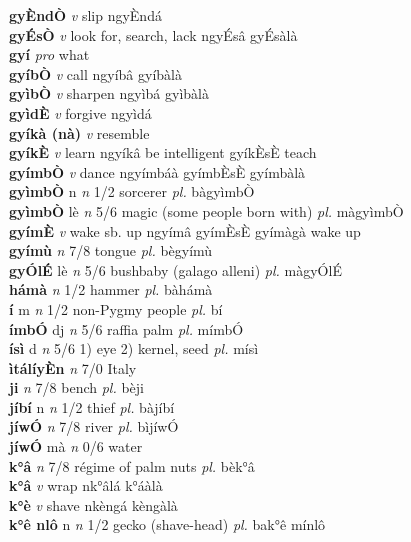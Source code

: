 \documentclass{article}
\begin{document}
{\bf gyÈndÒ}  {\it v} slip   ngyÈndá      \\ 
{\bf gyÉsÒ}  {\it v} look for, search, lack   ngyÉsâ   gyÉsàlà   \\ 
{\bf gyí}  {\it pro} what         \\ 
{\bf gyíbÒ}  {\it v} call   ngyíbâ   gyíbàlà   \\ 
{\bf gyìbÒ}  {\it v} sharpen   ngyìbá   gyìbàlà   \\ 
{\bf gyìdÈ}  {\it v} forgive   ngyìdá      \\ 
{\bf gyíkà (nà)}  {\it v} resemble         \\ 
{\bf gyíkÈ}  {\it v} learn   ngyíkâ be intelligent  gyíkÈsÈ teach    \\ 
{\bf gyímbÒ}  {\it v} dance   ngyímbáà  gyímbÈsÈ gyímbàlà   \\ 
{\bf gyìmbÒ} n {\it n} 1/2 sorcerer {\it pl.} bàgyìmbÒ         \\ 
{\bf gyìmbÒ} lè {\it n} 5/6 magic (some people born with) {\it pl.} màgyìmbÒ         \\ 
{\bf gyímÈ}  {\it v} wake sb. up   ngyímâ  gyímÈsÈ  gyímàgà wake up  \\ 
{\bf gyímù}  {\it n} 7/8 tongue {\it pl.} bègyímù         \\ 
{\bf gyÓlÉ} lè {\it n} 5/6 bushbaby (galago alleni) {\it pl.} màgyÓlÉ         \\ 
{\bf hámà}  {\it n} 1/2 hammer {\it pl.} bàhámà         \\ 
{\bf í} m {\it n} 1/2 non-Pygmy people {\it pl.} bí         \\ 
{\bf ímbÓ} dj {\it n} 5/6 raffia palm {\it pl.} mímbÓ         \\ 
{\bf ísì} d {\it n} 5/6 1) eye 2) kernel, seed {\it pl.} mísì         \\ 
{\bf ìtálíyÈn}  {\it n} 7/0 Italy         \\ 
{\bf ji}  {\it n} 7/8 bench {\it pl.} bèji         \\ 
{\bf jíbí} n {\it n} 1/2 thief {\it pl.} bàjíbí         \\ 
{\bf jíwÓ}  {\it n} 7/8 river {\it pl.} bìjíwÓ         \\ 
{\bf jíwÓ} mà {\it n} 0/6 water         \\ 
{\bf k°â}  {\it n} 7/8 régime of palm nuts {\it pl.} bèk°â         \\ 
{\bf k°â}  {\it v} wrap   nk°âlá   k°áàlà   \\ 
{\bf k°è}  {\it v} shave   nkèngá   kèngàlà   \\ 
{\bf k°ê nlô} n {\it n} 1/2 gecko (shave-head) {\it pl.} bak°ê mínlô         \\ 
\end{document}
